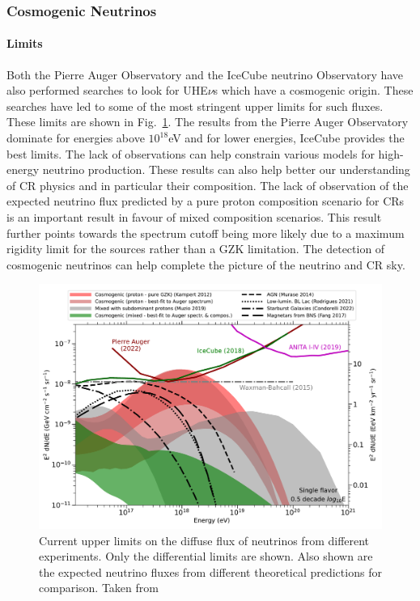 \subsubsection*{Cosmogenic Neutrinos}

  \paragraph{Limits}
  \label{subsubsec:CosmoNuLimits}
  Both the Pierre Auger Observatory and the IceCube neutrino Observatory have also performed searches to look for UHE$\nu$s which have a cosmogenic origin. These searches have led to some of the most stringent upper limits for such fluxes. These limits are shown in Fig.~\ref{fig:Nu_limits_auger}. The results from the Pierre Auger Observatory dominate for energies above $10^{18}$eV and for lower energies, IceCube provides the best limits. The lack of observations can help constrain various models for high-energy neutrino production. These results can also help better our understanding of \gls{CR} physics and in particular their composition. The lack of observation of the expected neutrino flux predicted by a pure proton composition scenario for \glspl{CR} is an important result in favour of mixed composition scenarios. This result further points towards the spectrum cutoff being more likely due to a maximum rigidity limit for the sources rather than a GZK limitation. The detection of cosmogenic neutrinos can help complete the picture of the neutrino and \gls{CR} sky. 

\begin{figure}[t!]
  \centering
  \includegraphics[width=14.5cm]{thesis_figures/CRnNu/neutrinolimits_icrc2023_wiki.pdf}
  \caption{Current upper limits on the diffuse flux of neutrinos from different experiments. Only the differential limits are shown. Also shown are the expected neutrino fluxes from different theoretical predictions for comparison. Taken from~\cite{PierreAuger:2023pjg}}
  \label{fig:Nu_limits_auger}
\end{figure}


